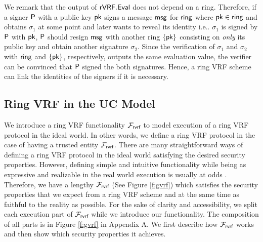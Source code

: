 We remark that the output of $ {\mathsf{rVRF}}.{\mathsf{Eval}} $ does not depend on a ring. Therefore, if a signer $ \mathsf{P} $ with a public key $ \mathsf{pk} $ signs a message $ \mathsf{msg} $ for $ \mathsf{ring} $ where $ \mathsf{pk} \in \mathsf{ring} $ and obtains $ \sigma_1 $ at some point  and later wants to reveal its identity i.e.. $ \sigma_1 $ is signed by $ \mathsf{P} $ with $ \mathsf{pk} $, $ \mathsf{P} $ should resign $ \mathsf{msg} $ with another ring $ \{\mathsf{pk}\} $ consisting on \emph{only} its public key and obtain another signature $ \sigma_2 $. Since the verification of $ \sigma_1 $ and $ \sigma_2 $ with $ \mathsf{ring} $ and $ \{\mathsf{pk}\} $, respectively, outputs the same evaluation value, the verifier can be convinced that $ \mathsf{P} $ signed the both signatures. Hence, a ring VRF scheme can link the identities of the signers if it is necessary.




\subsection{Ring VRF in the UC Model}
\label{subsec:uc_model}
We introduce a ring VRF functionality $ \mathcal{F}_{\textsf{rvrf}} $ to model execution of a ring VRF protocol in the ideal world. In other words, we define a ring VRF protocol in the case of having a trusted entity $ \mathcal{F}_{\textsf{rvrf}} $. There are many straightforward ways of defining a ring VRF protocol in the ideal world satisfying the desired security properties. However, defining simple and intuitive functionality while being as expressive and realizable in the real world execution is usually at odds \cite{canetti1}. Therefore, we have a lengthy $ \mathcal{F}_{\textsf{rvrf}} $ (See Figure \ref{f:gvrf}) which satisfies the security properties that we expect from a ring VRF scheme and at the same time as faithful to the reality as possible. For the sake of clarity and accessibility, we split each execution part of $ \mathcal{F}_{\textsf{rvrf}} $ while we introduce our functionality. The composition of all parts is in Figure \ref{f:gvrf} in Appendix A. We first describe how $  \mathcal{F}_{\textsf{rvrf}} $ works and then show which security properties it achieves.


